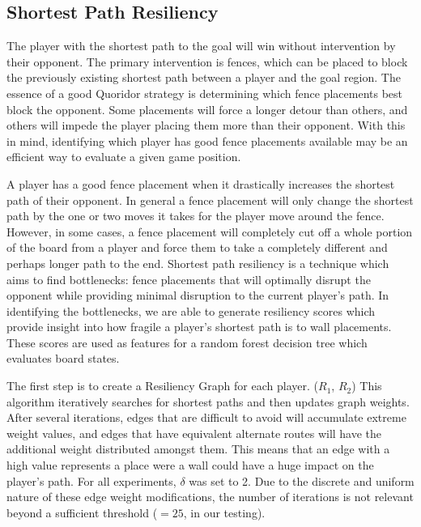 \documentclass[10pt]{article}
\begin{document}
\subsection{Shortest Path Resiliency}

The player with the shortest path to the goal will win without intervention by their opponent. The primary intervention is fences, which can be placed to block the previously existing shortest path between a player and the goal region. The essence of a good Quoridor strategy is determining which fence placements best block the opponent. Some placements will force a longer detour than others, and others will impede the player placing them more than their opponent. With this in mind, identifying which player has good fence placements available may be an efficient way to evaluate a given game position.  

A player has a good fence placement when it drastically increases the shortest path of their opponent. In general a fence placement will only change the shortest path by the one or two moves it takes for the player move around the fence. However, in some cases, a fence placement will completely cut off a whole portion of the board from a player and force them to take a completely different and perhaps longer path to the end. Shortest path resiliency is a technique which aims to find bottlenecks: fence placements that will optimally disrupt the opponent while providing minimal disruption to the current player's path. In identifying the bottlenecks, we are able to generate resiliency scores which provide insight into how fragile a player's shortest path is to wall placements. These scores are used as features for a random forest decision tree which evaluates board states.

The first step is to create a Resiliency Graph for each player. ($R_1$, $R_2$) This algorithm iteratively searches for shortest paths and then updates graph weights. After several iterations, edges that are difficult to avoid will accumulate extreme weight values, and edges that have equivalent alternate routes will have the additional weight distributed amongst them. This means that an edge with a high value represents a place were a wall could have a huge impact on the player's path. For all experiments, $\delta$ was set to 2. Due to the discrete and uniform nature of these edge weight modifications, the number of iterations is not relevant beyond a sufficient threshold ($=25$, in our testing).
\end{document}
